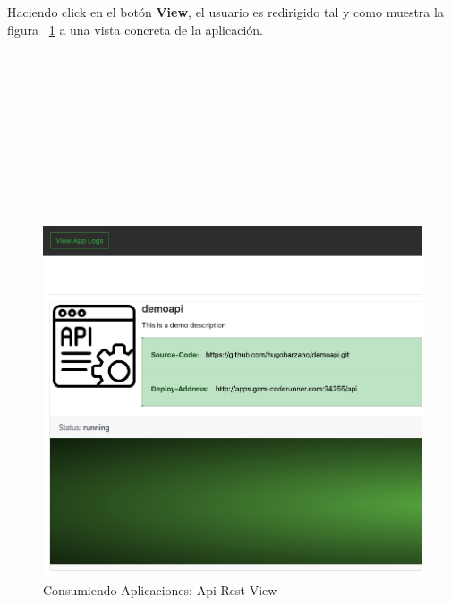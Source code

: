 \documentclass[a4paper,11pt]{book}
\begin{document}
Haciendo click en el botón \textbf{View}, el usuario es redirigido tal y como muestra la figura ~\ref{1_5} a una vista concreta de la aplicación. 
~\\
~\\
~\\
~\\
~\\
~\\
~\\
~\\
~\\
~\\
~\\
\begin{figure}[H]
\centering
\includegraphics[scale=0.4]{imagenes/casouso_a/1_5.png}
\caption{ Consumiendo Aplicaciones: Api-Rest View   }
\label{1_5}
\end{figure}
\end{document}
